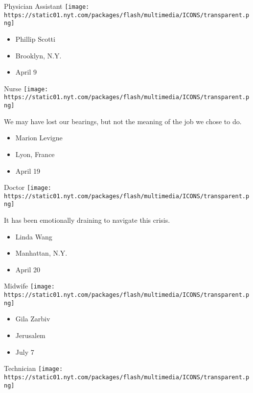 \protect\hyperlink{item-phillip-scotti}{}

Physician Assistant
\texttt{[image: https://static01.nyt.com/packages/flash/multimedia/ICONS/transparent.png]}

\begin{itemize}
\tightlist
\item
  Phillip Scotti
\item
  Brooklyn, N.Y.
\item
  April 9
\end{itemize}

\protect\hyperlink{item-marion-levigne}{}

Nurse
\texttt{[image: https://static01.nyt.com/packages/flash/multimedia/ICONS/transparent.png]}

We may have lost our bearings, but not the meaning of the job we chose
to do.

\begin{itemize}
\tightlist
\item
  Marion Levigne
\item
  Lyon, France
\item
  April 19
\end{itemize}

\protect\hyperlink{item-linda-wang}{}

Doctor
\texttt{[image: https://static01.nyt.com/packages/flash/multimedia/ICONS/transparent.png]}

It has been emotionally draining to navigate this crisis.

\begin{itemize}
\tightlist
\item
  Linda Wang
\item
  Manhattan, N.Y.
\item
  April 20
\end{itemize}

\protect\hyperlink{item-gila-zarbiv}{}

Midwife
\texttt{[image: https://static01.nyt.com/packages/flash/multimedia/ICONS/transparent.png]}

\begin{itemize}
\tightlist
\item
  Gila Zarbiv
\item
  Jerusalem
\item
  July 7
\end{itemize}

\protect\hyperlink{item-dolapo-olugbile}{}

Technician
\texttt{[image: https://static01.nyt.com/packages/flash/multimedia/ICONS/transparent.png]}

